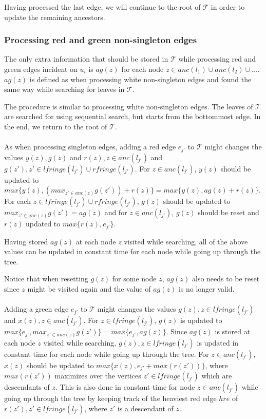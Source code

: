 Having processed the last edge, we will continue to the root of $\mathcal{T}$ in order to update the remaining ancestors.

\subsubsection{Processing red and green non-singleton edges} 
The only extra information that should be stored in $\mathcal{T}$ while processing red and green edges incident on $u_i$ is $ag(z)$ for each node $z \in {anc(l_1) \cup anc(l_2) \cup ... }$. $ag(z)$ is defined as when processing white non-singleton edges and found the same way while searching for leaves in $\mathcal{T}$.

The procedure is similar to processing white non-singleton edges. The leaves of $\mathcal{T}$ are searched for using sequential search, but starts from the bottommost edge. In the end, we return to the root of $\mathcal{T}$.
\\
\\
As when processing singleton edges, adding a red edge $e_{j'}$ to $\mathcal{T}$ might changes the values $y(z), g(z)$ and $r(z), z \in anc(l_{j'})$ and $g(z'), z' \in lfringe(l_{j'}) \cup rfringe(l_{j'})$. For $z \in anc(l_{j'})$, $y(z)$ should be updated to $max\{y(z), (max_{z' \in anc(z)} g(z')) + r(z)\} = max\{y(z), ag(z) + r(z)\}$. For each $z \in lfringe(l_{j'}) \cup rfringe(l_{j'})$, $g(z)$ should be updated to $max_{z' \in anc(z)} g(z') = ag(z)$ and for $z \in anc(l_{j'})$, $g(z)$ should be reset and $r(z)$ updated to $max\{r(z), e_{j'}\}$.

Having stored $ag(z)$ at each node $z$ visited while searching, all of the above values can be updated in constant time for each node while going up through the tree.

Notice that when resetting $g(z)$ for some node $z$, $ag(z)$ also needs to be reset since $z$ might be visited again and the value of $ag(z)$ is no longer valid.
\\
\\
Adding a green edge $e_{j'}$ to $\mathcal{T}$ might changes the values $g(z), z \in lfringe(l_{j'})$ and $x(z), z \in anc(l_{j'})$. For $z \in lfringe(l_{j'})$, $g(z)$ is updated to $max\{e_{j'}, max_{z' \in anc(z)} g(z')\} = max\{e_{j'}, ag(z)\}$. Since $ag(z)$ is stored at each node $z$ visited while searching, $g(z), z \in lfringe(l_{j'})$ is updated in constant time for each node while going up through the tree. For $z \in anc(l_{j'})$, $x(z)$ should be updated to $max\{x(z), e_{j'} + max(r(z'))\}$, where $max(r(z'))$ maximizes over the vertices $z' \in lfringe(l_{j'})$ which are descendants of $z$. This is also done in constant time for node $z \in anc(l_{j'})$ while going up through the tree by keeping track of the heaviest red edge $hre$ of $r(z'), z' \in lfringe(l_{j'})$, where $z'$ is a descendant of $z$.

